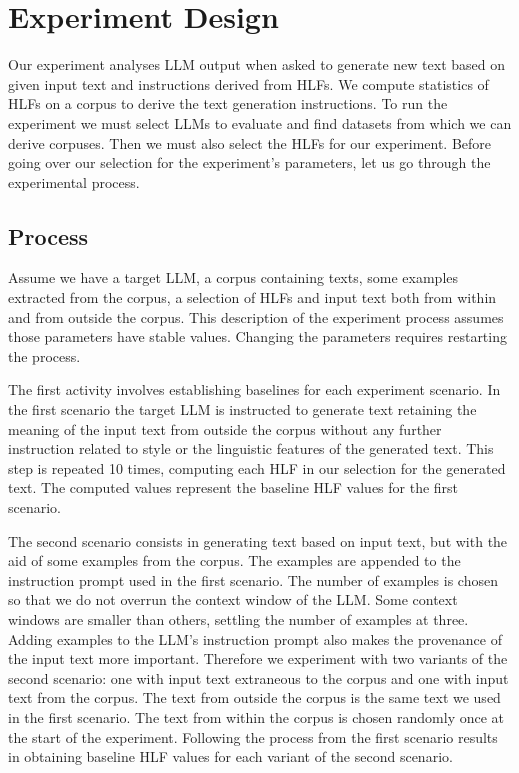 \documentclass[11pt]{article}
\begin{document}
\section{Experiment Design}\label{method}

Our experiment analyses LLM output when asked to generate new text based on
given input text and instructions derived from HLFs.
We compute statistics of HLFs on a corpus to derive the text generation
instructions.
To run the experiment we must select LLMs to evaluate and find datasets from
which we can derive corpuses.
Then we must also select the HLFs for our experiment.
Before going over our selection for the experiment's parameters, let us go
through the experimental process.

\subsection{Process}\label{subsec:experiment-process}

Assume we have a target LLM, a corpus containing texts, some examples extracted
from the corpus, a selection of HLFs and input text both from within and from
outside the corpus.
This description of the experiment process assumes those parameters have stable
values.
Changing the parameters requires restarting the process.

The first activity involves establishing baselines for each experiment scenario.
In the first scenario the target LLM is instructed to generate text retaining
the meaning of the input text from outside the corpus without any further
instruction related to style or the linguistic features of the generated text.
This step is repeated 10 times, computing each HLF in our selection for the
generated text.
The computed values represent the baseline HLF values for the first scenario.

The second scenario consists in generating text based on input text, but with
the aid of some examples from the corpus.
The examples are appended to the instruction prompt used in the first scenario.
The number of examples is chosen so that we do not overrun the context window of
the LLM.
Some context windows are smaller than others, settling the number of examples at
three.
Adding examples to the LLM's instruction prompt also makes the provenance of the
input text more important.
Therefore we experiment with two variants of the second scenario: one with input
text extraneous to the corpus and one with input text from the corpus.
The text from outside the corpus is the same text we used in the first scenario.
The text from within the corpus is chosen randomly once at the start of the
experiment.
Following the process from the first scenario results in obtaining baseline HLF
values for each variant of the second scenario.
\end{document}
